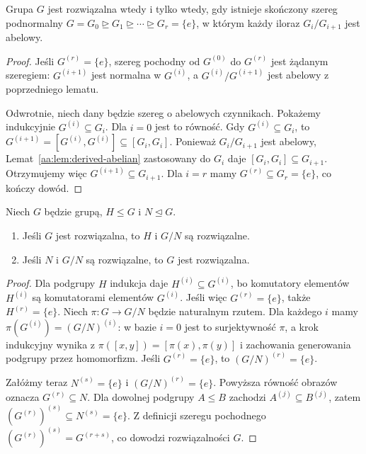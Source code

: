 \begin{twierdzenie}
\label{aa:tw:solvable-series}
Grupa $G$ jest rozwiązalna wtedy i tylko wtedy, gdy istnieje
skończony szereg podnormalny
$G=G_0\trianglerighteq G_1\trianglerighteq\cdots
\trianglerighteq G_r=\{e\}$,
w którym każdy iloraz $G_i/G_{i+1}$ jest abelowy.
\end{twierdzenie}
\begin{proof}
Jeśli $G^{(r)}=\{e\}$, szereg pochodny od $G^{(0)}$
do $G^{(r)}$ jest żądanym szeregiem:
$G^{(i+1)}$ jest normalna w $G^{(i)}$,
a $G^{(i)}/G^{(i+1)}$ jest abelowy
z poprzedniego lematu.

Odwrotnie, niech dany będzie szereg o abelowych czynnikach.
Pokażemy indukcyjnie $G^{(i)}\subseteq G_i$.
Dla $i=0$ jest to równość. Gdy $G^{(i)}\subseteq G_i$,
to
$G^{(i+1)}=[G^{(i)},G^{(i)}]\subseteq[G_i,G_i]$.
Ponieważ $G_i/G_{i+1}$ jest abelowy,
Lemat~\ref{aa:lem:derived-abelian} zastosowany do $G_i$
daje $[G_i,G_i]\subseteq G_{i+1}$.
Otrzymujemy więc $G^{(i+1)}\subseteq G_{i+1}$.
Dla $i=r$ mamy $G^{(r)}\subseteq G_r=\{e\}$,
co kończy dowód.
\end{proof}

\begin{lemat}
\label{aa:lem:solvable-extension}
Niech $G$ będzie grupą, $H\le G$ i $N\trianglelefteq G$.
\begin{enumerate}
\item Jeśli $G$ jest rozwiązalna, to $H$ i $G/N$ są rozwiązalne.
\item Jeśli $N$ i $G/N$ są rozwiązalne, to $G$ jest rozwiązalna.
\end{enumerate}
\end{lemat}
\begin{proof}
Dla podgrupy $H$ indukcja daje
$H^{(i)}\subseteq G^{(i)}$, bo komutatory elementów
$H^{(i)}$ są komutatorami elementów $G^{(i)}$.
Jeśli więc $G^{(r)}=\{e\}$, także $H^{(r)}=\{e\}$.
Niech $\pi:G\to G/N$ będzie naturalnym rzutem.
Dla każdego $i$ mamy
$\pi(G^{(i)})=(G/N)^{(i)}$:
w bazie $i=0$ jest to surjektywność $\pi$, a krok indukcyjny
wynika z $\pi([x,y])=[\pi(x),\pi(y)]$ i zachowania
generowania podgrupy przez homomorfizm.
Jeśli $G^{(r)}=\{e\}$, to $(G/N)^{(r)}=\{e\}$.

Załóżmy teraz $N^{(s)}=\{e\}$ i $(G/N)^{(r)}=\{e\}$.
Powyższa równość obrazów oznacza $G^{(r)}\subseteq N$.
Dla dowolnej podgrupy $A\le B$ zachodzi $A^{(j)}\subseteq B^{(j)}$,
zatem $(G^{(r)})^{(s)}\subseteq N^{(s)}=\{e\}$.
Z definicji szeregu pochodnego
$(G^{(r)})^{(s)}=G^{(r+s)}$, co dowodzi rozwiązalności $G$.
\end{proof}

